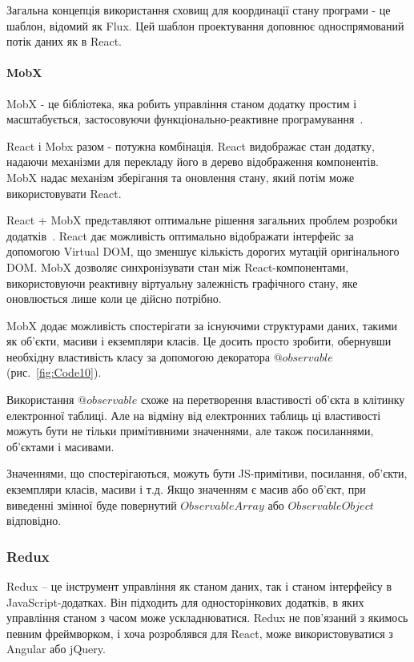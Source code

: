 Загальна концепція використання сховищ для координації стану програми - це шаблон, відомий як Flux. Цей шаблон проектування доповнює односпрямований потік даних як в React.

\paragraph{MobX}

MobX - це бібліотека, яка робить управління станом додатку простим і масштабується, застосовуючи функціонально-реактивне програмування~\cite{mezzalira2018mobx}. 

React і Mobx разом - потужна комбінація. React видображає стан додатку, надаючи механізми для перекладу його в дерево відображення компонентів. MobX надає механізм зберігання та оновлення стану, який потім може використовувати React.

React + MobX предcтавляют оптимальне рішення загальних проблем розробки додатків~\cite{9781789344837}. React дає можливість оптимально відображати інтерфейс за допомогою Virtual DOM, що зменшує кількість дорогих мутацій оригінального DOM. MobX дозволяє синхронізувати стан між React-компонентами, використовуючи реактивну віртуальну залежність графічного стану, яке оновлюється лише коли це дійсно потрібно.

MobX додає можливість спостерігати за існуючими структурами даних, такими як об'єкти, масиви і екземпляри класів. Це досить просто зробити, обернувши необхідну властивість класу за допомогою декоратора $@observable$ (рис.~\ref{fig:Code10}).


Використання $@observable$ схоже на перетворення властивості об'єкта в клітинку електронної таблиці. Але на відміну від електронних таблиць ці властивості можуть бути не тільки примітивними значеннями, але також посиланнями, об'єктами і масивами.

Значеннями, що спостерігаються, можуть бути JS-примітиви, посилання, об'єкти, екземпляри класів, масиви і т.д. Якщо значенням є масив або об'єкт, при виведенні змінної буде повернутий $Observable Array$ або $Observable Object$ відповідно.

\subsubsection{Redux}

Redux -- це інструмент управління як станом даних, так і станом інтерфейсу в JavaScript-додатках. Він підходить для односторінкових додатків, в яких управління станом з часом може ускладнюватися. Redux не пов'язаний з якимось певним фреймворком, і хоча розроблявся для React, може використовуватися з Angular або jQuery.

